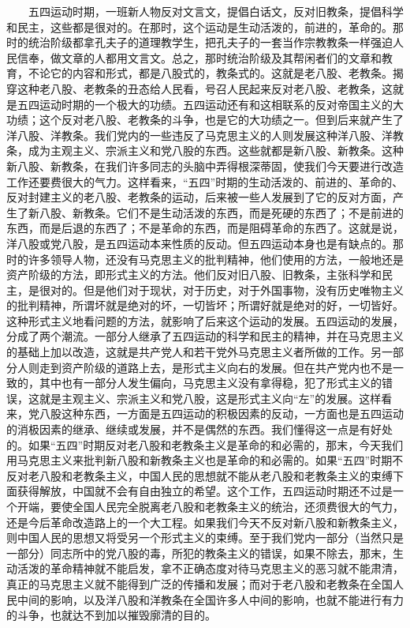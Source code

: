 \documentclass[cn,11pt,chinese]{elegantbook}
\begin{document}
　　五四运动时期，一班新人物反对文言文，提倡白话文，反对旧教条，提倡科学和民主，这些都是很对的。在那时，这个运动是生动活泼的，前进的，革命的。那时的统治阶级都拿孔夫子的道理教学生，把孔夫子的一套当作宗教教条一样强迫人民信奉，做文章的人都用文言文。总之，那时统治阶级及其帮闲者们的文章和教育，不论它的内容和形式，都是八股式的，教条式的。这就是老八股、老教条。揭穿这种老八股、老教条的丑态给人民看，号召人民起来反对老八股、老教条，这就是五四运动时期的一个极大的功绩。五四运动还有和这相联系的反对帝国主义的大功绩；这个反对老八股、老教条的斗争，也是它的大功绩之一。但到后来就产生了洋八股、洋教条。我们党内的一些违反了马克思主义的人则发展这种洋八股、洋教条，成为主观主义、宗派主义和党八股的东西。这些就都是新八股、新教条。这种新八股、新教条，在我们许多同志的头脑中弄得根深蒂固，使我们今天要进行改造工作还要费很大的气力。这样看来，“五四”时期的生动活泼的、前进的、革命的、反对封建主义的老八股、老教条的运动，后来被一些人发展到了它的反对方面，产生了新八股、新教条。它们不是生动活泼的东西，而是死硬的东西了；不是前进的东西，而是后退的东西了；不是革命的东西，而是阻碍革命的东西了。这就是说，洋八股或党八股，是五四运动本来性质的反动。但五四运动本身也是有缺点的。那时的许多领导人物，还没有马克思主义的批判精神，他们使用的方法，一般地还是资产阶级的方法，即形式主义的方法。他们反对旧八股、旧教条，主张科学和民主，是很对的。但是他们对于现状，对于历史，对于外国事物，没有历史唯物主义的批判精神，所谓坏就是绝对的坏，一切皆坏；所谓好就是绝对的好，一切皆好。这种形式主义地看问题的方法，就影响了后来这个运动的发展。五四运动的发展，分成了两个潮流。一部分人继承了五四运动的科学和民主的精神，并在马克思主义的基础上加以改造，这就是共产党人和若干党外马克思主义者所做的工作。另一部分人则走到资产阶级的道路上去，是形式主义向右的发展。但在共产党内也不是一致的，其中也有一部分人发生偏向，马克思主义没有拿得稳，犯了形式主义的错误，这就是主观主义、宗派主义和党八股，这是形式主义向“左”的发展。这样看来，党八股这种东西，一方面是五四运动的积极因素的反动，一方面也是五四运动的消极因素的继承、继续或发展，并不是偶然的东西。我们懂得这一点是有好处的。如果“五四”时期反对老八股和老教条主义是革命的和必需的，那末，今天我们用马克思主义来批判新八股和新教条主义也是革命的和必需的。如果“五四”时期不反对老八股和老教条主义，中国人民的思想就不能从老八股和老教条主义的束缚下面获得解放，中国就不会有自由独立的希望。这个工作，五四运动时期还不过是一个开端，要使全国人民完全脱离老八股和老教条主义的统治，还须费很大的气力，还是今后革命改造路上的一个大工程。如果我们今天不反对新八股和新教条主义，则中国人民的思想又将受另一个形式主义的束缚。至于我们党内一部分（当然只是一部分）同志所中的党八股的毒，所犯的教条主义的错误，如果不除去，那末，生动活泼的革命精神就不能启发，拿不正确态度对待马克思主义的恶习就不能肃清，真正的马克思主义就不能得到广泛的传播和发展；而对于老八股和老教条在全国人民中间的影响，以及洋八股和洋教条在全国许多人中间的影响，也就不能进行有力的斗争，也就达不到加以摧毁廓清的目的。\\
\end{document}
